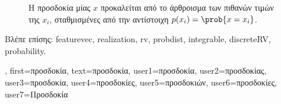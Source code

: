 {{\begin{figure}[H]
\begin{center}
			\end{center}
			\vspace*{-5mm}
		{
		\caption{\foreignlanguage{greek}{Η προσδοκία μίας}  $x$ \foreignlanguage{greek}{προκαλείται από το 
			άρθροισμα των πιθανών τιμών της $x_{i}$, σταθμισμένες από την αντίστοιχη}  $p(x_i) = \prob{x= x_i}$. 
			\label{fig_expect_discrete_dict}} }
 		\end{figure}
		\foreignlanguage{greek}{Βλέπε επίσης:} \gls{featurevec}, \gls{realization}, \gls{rv}, \gls{probdist}, \gls{integrable}, 
		\gls{discreteRV}, \gls{probability}.},
 	first={\foreignlanguage{greek}{προσδοκία}},
 	text={\foreignlanguage{greek}{προσδοκία}},
	user1={\foreignlanguage{greek}{προσδοκία}}, %
 	user2={\foreignlanguage{greek}{προσδοκίας}}, %
 	user3={\foreignlanguage{greek}{προσδοκία}}, %
	user4={\foreignlanguage{greek}{προσδοκίες}}, %
 	user5={\foreignlanguage{greek}{προσδοκιών}}, %
 	user6={\foreignlanguage{greek}{προσδοκίες}}, %
	user7={\foreignlanguage{greek}{Προσδοκία}} %
}

